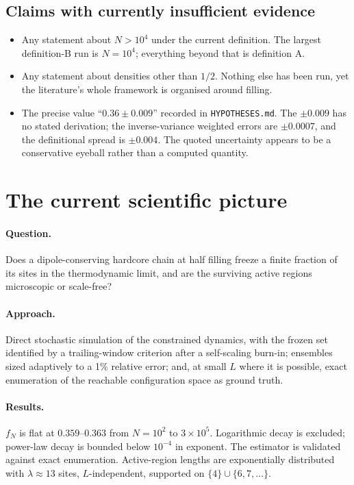 \documentclass[11pt,a4paper]{article}
\begin{document}
\subsection*{Claims with currently insufficient evidence}
\begin{itemize}
\item Any statement about $N>10^4$ under the current definition. The largest
definition-B run is $N=10^4$; everything beyond that is definition A.
\item Any statement about densities other than $1/2$. Nothing else has been
run, yet the literature's whole framework is organised around filling.
\item The precise value ``$0.36\pm0.009$'' recorded in
\texttt{HYPOTHESES.md}. The $\pm0.009$ has no stated derivation; the
inverse-variance weighted errors are $\pm0.0007$, and the definitional
spread is $\pm0.004$. The quoted uncertainty appears to be a conservative
eyeball rather than a computed quantity.
\end{itemize}

\section{The current scientific picture}

\paragraph{Question.} Does a dipole-conserving hardcore chain at half
filling freeze a finite fraction of its sites in the thermodynamic limit,
and are the surviving active regions microscopic or scale-free?

\paragraph{Approach.} Direct stochastic simulation of the constrained
dynamics, with the frozen set identified by a trailing-window criterion
after a self-scaling burn-in; ensembles sized adaptively to a 1\% relative
error; and, at small $L$ where it is possible, exact enumeration of the
reachable configuration space as ground truth.

\paragraph{Results.} $f_N$ is flat at $0.359$--$0.363$ from $N=10^2$ to
$3\times10^5$. Logarithmic decay is excluded; power-law decay is bounded
below $10^{-4}$ in exponent. The estimator is validated against exact
enumeration. Active-region lengths are exponentially distributed with
$\lambda\approx13$ sites, $L$-independent, supported on
$\{4\}\cup\{6,7,\dots\}$.
\end{document}
